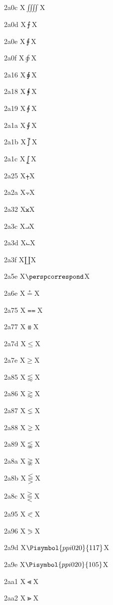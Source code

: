 \documentclass[11pt]{article}
\begin{document}
2a0c X{\ensuremath{\iiiint}}X

2a0d X{\ensuremath{\intbar}}X

2a0e X{\ensuremath{\intBar}}X

2a0f X{\ensuremath{\clockoint}}X

2a16 X{\ensuremath{\sqrint}}X

2a18 X{\ensuremath{\intx}}X

2a19 X{\ensuremath{\intcap}}X

2a1a X{\ensuremath{\intcup}}X

2a1b X{\ensuremath{\upint}}X

2a1c X{\ensuremath{\lowint}}X

2a25 X{\ensuremath{\plusdot}}X

2a2a X{\ensuremath{\minusdot}}X

2a32 X{\ensuremath{\btimes}}X

2a3c X{\ensuremath{\intprod}}X

2a3d X{\ensuremath{\intprodr}}X

2a3f X{\ensuremath{\amalg}}X

2a5e X{\ensuremath{\perspcorrespond}}X

2a6e X{\ensuremath{\stackrel{*}{=}}}X

2a75 X{\ensuremath{\Equal}}X

2a77 X{\ensuremath{\ddotseq}}X

2a7d X{\ensuremath{\leqslant}}X

2a7e X{\ensuremath{\geqslant}}X

2a85 X{\ensuremath{\lessapprox}}X

2a86 X{\ensuremath{\gtrapprox}}X

2a87 X{\ensuremath{\lneq}}X

2a88 X{\ensuremath{\gneq}}X

2a89 X{\ensuremath{\lnapprox}}X

2a8a X{\ensuremath{\gnapprox}}X

2a8b X{\ensuremath{\lesseqqgtr}}X

2a8c X{\ensuremath{\gtreqqless}}X

2a95 X{\ensuremath{\eqslantless}}X

2a96 X{\ensuremath{\eqslantgtr}}X

2a9d X{\ensuremath{\Pisymbol{ppi020}{117}}}X

2a9e X{\ensuremath{\Pisymbol{ppi020}{105}}}X

2aa1 X{\ensuremath{\NestedLessLess}}X

2aa2 X{\ensuremath{\NestedGreaterGreater}}X
\end{document}
